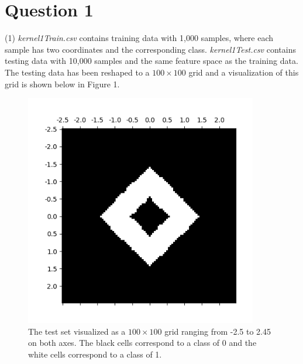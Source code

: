 \section*{Question 1}
(1) \textit{kernel1Train.csv} contains training data with 1,000 samples, where each sample has two coordinates and the corresponding class. \textit{kernel1Test.csv} contains testing data with 10,000 samples and the same feature space as the training data. The testing data has been reshaped to a $100 \times 100$ grid and a visualization of this grid is shown below in Figure 1.
\begin{figure}[h]
    \centering
    \includegraphics[height=4in]{Figure_1.png}
    \caption{The test set visualized as a $100 \times 100$ grid ranging from -2.5 to 2.45 on both axes. The black cells correspond to a class of 0 and the white cells correspond to a class of 1.}
\end{figure}

